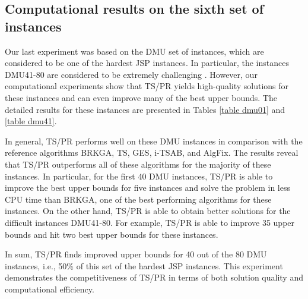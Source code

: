 \documentclass[authoryear,12pt]{elsarticle}
\begin{document}
\subsection{Computational results on the sixth set of instances}
\label{subsec results 5}

Our last experiment was based on the DMU set of instances, which are considered to be one of the hardest JSP instances. In particular, the instances DMU41-80 are considered to be extremely challenging \citep{Demirkol1997DMU01-80}. However, our computational experiments show that TS/PR yields high-quality solutions for these instances and can even improve many of the best upper bounds. The detailed results for these instances are presented in Tables \ref{table dmu01} and \ref{table dmu41}.

In general, TS/PR performs well on these DMU instances in comparison with the reference algorithms BRKGA, TS, GES, i-TSAB, and AlgFix. The results reveal that TS/PR outperforms all of these algorithms for the majority of these instances. In particular, for the first 40 DMU instances, TS/PR is able to improve the best upper bounds for five instances and solve the problem in less CPU time than BRKGA, one of the best performing algorithms for these instances. 
On the other hand, TS/PR is able to obtain better solutions for the difficult instances DMU41-80. For example, TS/PR is able to improve 35 upper bounds and hit two best upper bounds for these instances.

In sum, TS/PR finds improved upper bounds for 40 out of the 80 DMU instances, i.e., 50\% of this set of the hardest JSP instances. This experiment demonstrates the competitiveness of TS/PR in terms of both solution quality and computational efficiency.
\end{document}
